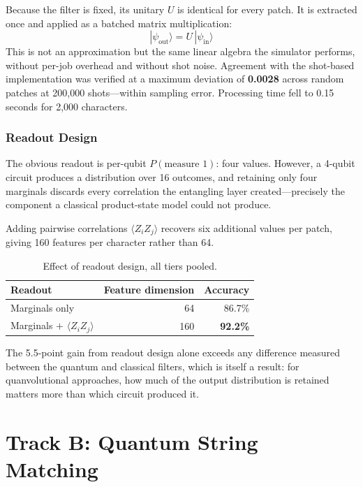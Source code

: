 \documentclass[11pt,a4paper]{article}
\begin{document}
Because the filter is fixed, its unitary $U$ is identical for every patch. It is
extracted once and applied as a batched matrix multiplication:
\begin{equation}
|\psi_{\text{out}}\rangle = U\,|\psi_{\text{in}}\rangle
\end{equation}
This is not an approximation but the same linear algebra the simulator performs,
without per-job overhead and without shot noise. Agreement with the shot-based
implementation was verified at a maximum deviation of \textbf{0.0028} across
random patches at 200{,}000 shots---within sampling error. Processing time fell
to 0.15 seconds for 2{,}000 characters.

\subsubsection{Readout Design}

The obvious readout is per-qubit $P(\text{measure }1)$: four values. However, a
4-qubit circuit produces a distribution over 16 outcomes, and retaining only four
marginals discards every correlation the entangling layer created---precisely the
component a classical product-state model could not produce.

Adding pairwise correlations $\langle Z_i Z_j\rangle$ recovers six additional
values per patch, giving 160 features per character rather than 64.

\begin{table}[h]
\centering
\caption{Effect of readout design, all tiers pooled.}
\begin{tabular}{@{}lrr@{}}
\toprule
Readout & Feature dimension & Accuracy \\
\midrule
Marginals only & 64 & 86.7\% \\
Marginals $+$ $\langle Z_i Z_j\rangle$ & 160 & \textbf{92.2\%} \\
\bottomrule
\end{tabular}
\end{table}

The 5.5-point gain from readout design alone exceeds any difference measured
between the quantum and classical filters, which is itself a result: for
quanvolutional approaches, how much of the output distribution is retained
matters more than which circuit produced it.

\section{Track B: Quantum String Matching}
\label{sec:oracle}
\end{document}
